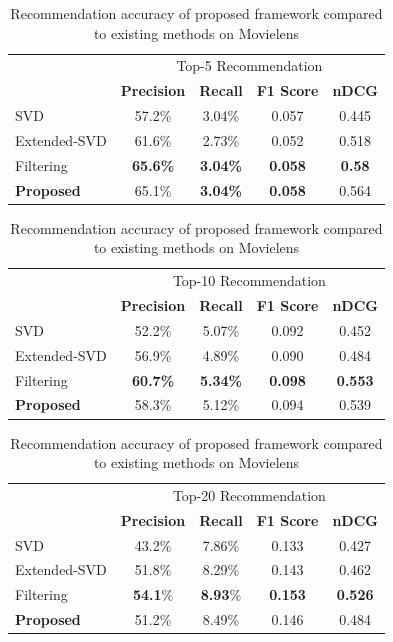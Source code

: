 \documentclass[a4paper,12pt]{report}
\begin{document}
\begin{table}[!htb]
    \centering
    \caption{Recommendation accuracy of proposed framework compared to existing methods on Movielens}
    \begin{tabular}{|l || c c c c|}
    \hline
         & \multicolumn{4}{c|}{Top-5 Recommendation} \\
    \cline{2-5}
         &  \textbf{Precision} & \textbf{Recall} & \textbf{F1 Score} & \textbf{nDCG} \\
    \hline
    SVD     & 57.2\% & 3.04\% & 0.057 & 0.445 \\
    Extended-SVD & 61.6\% & 2.73\% & 0.052 & 0.518\\
    Filtering & \textbf{65.6\%} & \textbf{3.04\%} & \textbf{0.058} & \textbf{0.58}\\
    \textbf{Proposed}  & 65.1\% & \textbf{3.04\%} & \textbf{0.058} & 0.564 \\
    \hline
    \end{tabular}
    \bigskip
    
    \begin{tabular}{|l || c c c c|}
    \hline
         & \multicolumn{4}{c|}{Top-10 Recommendation} \\
    \cline{2-5}
         &  \textbf{Precision} & \textbf{Recall} & \textbf{F1 Score} & \textbf{nDCG} \\
    \hline
    SVD     & 52.2\% & 5.07\% & 0.092 & 0.452 \\
    Extended-SVD & 56.9\% & 4.89\% & 0.090 & 0.484\\
    Filtering & \textbf{60.7\%} & \textbf{5.34\%} & \textbf{0.098} & \textbf{0.553}\\
    \textbf{Proposed}  & 58.3\% & 5.12\% & 0.094 & 0.539 \\
    \hline
    \end{tabular}
    \bigskip
    
    \begin{tabular}{|l || c c c c|}
    \hline
         & \multicolumn{4}{c|}{Top-20 Recommendation} \\
    \cline{2-5}
         &  \textbf{Precision} & \textbf{Recall} & \textbf{F1 Score} & \textbf{nDCG} \\
    \hline
    SVD     & 43.2\% & 7.86\% & 0.133 & 0.427 \\
    Extended-SVD & 51.8\% & 8.29\% & 0.143 & 0.462\\
    Filtering & \textbf{54.1}\% & \textbf{8.93}\% & \textbf{0.153} & \textbf{0.526}\\
    \textbf{Proposed}  & 51.2\% & 8.49\% & 0.146 & 0.484 \\
    \hline
    \end{tabular}
    \label{tab:ML_acc}
\end{table}
\end{document}
